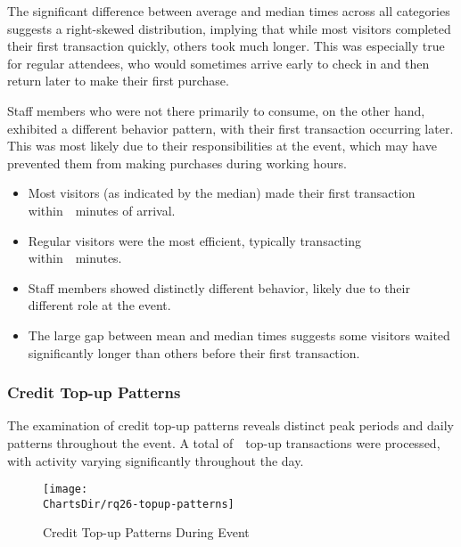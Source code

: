 The significant difference between average and median times across all categories suggests a right-skewed distribution, implying that while most visitors completed their first transaction quickly, others took much longer.
This was especially true for regular attendees, who would sometimes arrive early to check in and then return later to make their first purchase.

Staff members who were not there primarily to consume, on the other hand, exhibited a different behavior pattern, with their first transaction occurring later.
This was most likely due to their responsibilities at the event, which may have prevented them from making purchases during working hours.

\begin{keytakeaways}
	\begin{itemize}
		\item Most visitors (as indicated by the median) made their first transaction within~~minutes of arrival.
		\item Regular visitors were the most efficient, typically transacting within~~minutes.
		\item Staff members showed distinctly different behavior, likely due to their different role at the event.
		\item The large gap between mean and median times suggests some visitors waited significantly longer than others before their first transaction.
	\end{itemize}
\end{keytakeaways}


\subsubsection{Credit Top-up Patterns}
\label{subsubsec:analysis-credit-topup}


The examination of credit top-up patterns reveals distinct peak periods and daily patterns throughout the event.
A total of~~top-up transactions were processed, with activity varying significantly throughout the day.

\begin{figure}[H]
	\centering
	\texttt{[image: \\ChartsDir/rq26-topup-patterns]}
	\caption{ Credit Top-up Patterns During Event}
	\label{fig:topup-patterns}
	\source
\end{figure}

